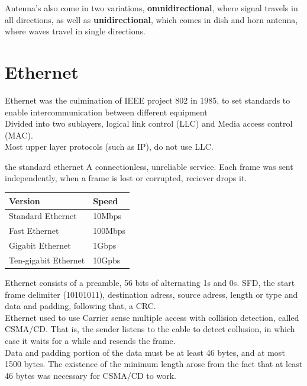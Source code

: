 \documentclass[11pt,a4paper,twoside]{book}
\begin{document}
Antenna's also come in two variations, \textbf{omnidirectional}, where signal travels in all directions, as well as \textbf{unidirectional}, which comes in dish and horn antenna, where waves travel in single directions.

\section{Ethernet}

Ethernet was the culmination of IEEE project 802 in 1985, to set standards to enable intercommunication between different equipment\\

Divided into two sublayers, logical link control (LLC) and Media access control (MAC).\\

Most upper layer protocols (such as IP), do not use LLC.

the standard ethernet A connectionless, unreliable service. Each frame was sent independently, when a frame is lost or corrupted, reciever drops it.

\begin{table}
\begin{tabular}{ll}
\toprule
Version & Speed \\
\midrule
Standard Ethernet & 10Mbps \\
Fast Ethernet & 100Mbps \\ 
Gigabit Ethernet & 1Gbps \\
Ten-gigabit Ethernet & 10Gpbs \\
\bottomrule
\end{tabular}
\end{table}

Ethernet consists of a preamble, 56 bits of alternating 1s and 0s. SFD, the start frame delimiter (10101011), destination adress, source adress, length or type and data and padding, following that, a CRC.\\

Ethernet used to use Carrier sense multiple access with collision detection, called CSMA/CD. That is, the sender listens to the cable to detect collusion, in which case it waits for a while and resends the frame.\\

Data and padding portion of the data must be at least 46 bytes, and at most 1500 bytes. The existence of the minimum length arose from the fact that at least 46 bytes was necessary for CSMA/CD to work.\\
\end{document}
